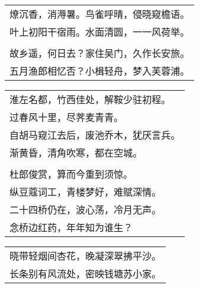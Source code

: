 \nopagebreak%
\nopagebreak%
\noindent\begin{minipage}{\linewidth}
  \vskip-3pt\begin{table}[H]
    \centering
    \begin{tabular}{@{}l@{}}
燎沉香，消溽暑。鸟雀呼晴，侵晓窥檐语。\\
叶上初阳干宿雨。水面清圆，一一风荷举。\\
\\
故乡遥，何日去？家住吴门，久作长安旅。\\
五月渔郎相忆否？小楫轻舟，梦入芙蓉浦。
    \end{tabular}
  \end{table}
\end{minipage}
\vspace{1cm}


\nopagebreak%
\nopagebreak%
\noindent\begin{minipage}{\linewidth}
  \vskip-3pt\begin{table}[H]
    \centering
    \begin{tabular}{@{}l@{}}
淮左名都，竹西佳处，解鞍少驻初程。\\
过春风十里，尽荠麦青青。\\
自胡马窥江去后，废池乔木，犹厌言兵。\\
渐黄昏，清角吹寒，都在空城。\\
\\
杜郎俊赏，算而今重到须惊。\\
纵豆蔻词工，青楼梦好，难赋深情。\\
二十四桥仍在，波心荡，冷月无声。\\
念桥边红药，年年知为谁生？
    \end{tabular}
  \end{table}
\end{minipage}
\vspace{1cm}


\nopagebreak%
\nopagebreak%
\noindent\begin{minipage}{\linewidth}
  \vskip-3pt\begin{table}[H]
    \centering
    \begin{tabular}{@{}l@{}}
晓带轻烟间杏花，晚凝深翠拂平沙。\\
长条别有风流处，密映钱塘苏小家。
    \end{tabular}
  \end{table}
\end{minipage}
\vspace{1cm}


